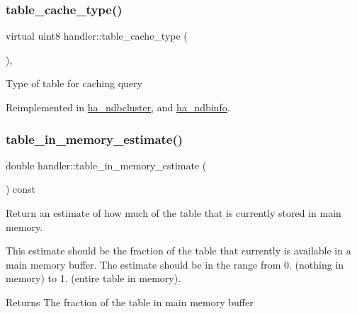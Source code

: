 \mbox{\label{classhandler_ab4d7cf309121ec10e4150860c8caa12a}} 
\subsubsection{\texorpdfstring{table\+\_\+cache\+\_\+type()}{table\_cache\_type()}}
{\footnotesize\ttfamily virtual uint8 handler\+::table\+\_\+cache\+\_\+type (\begin{DoxyParamCaption}{ }\end{DoxyParamCaption})\hspace{0.3cm}{\ttfamily [inline]}, {\ttfamily [virtual]}}

Type of table for caching query 

Reimplemented in \mbox{\hyperlink{classha__ndbcluster_ac3a23eb89230938663a59fcf8fbe908b}{ha\+\_\+ndbcluster}}, and \mbox{\hyperlink{classha__ndbinfo_ab23949e133485226e2c90e78eb914b60}{ha\+\_\+ndbinfo}}.

\mbox{\label{classhandler_a171927b3afde9e800755b834bd8d31bd}} 
\subsubsection{\texorpdfstring{table\+\_\+in\+\_\+memory\+\_\+estimate()}{table\_in\_memory\_estimate()}}
{\footnotesize\ttfamily double handler\+::table\+\_\+in\+\_\+memory\+\_\+estimate (\begin{DoxyParamCaption}{ }\end{DoxyParamCaption}) const}

Return an estimate of how much of the table that is currently stored in main memory.

This estimate should be the fraction of the table that currently is available in a main memory buffer. The estimate should be in the range from 0. (nothing in memory) to 1. (entire table in memory).

\begin{DoxyReturn}{Returns}
The fraction of the table in main memory buffer 
\end{DoxyReturn}
\mbox{\label{classhandler_a5e9380355a7eea5386ef061f36479258}} 
